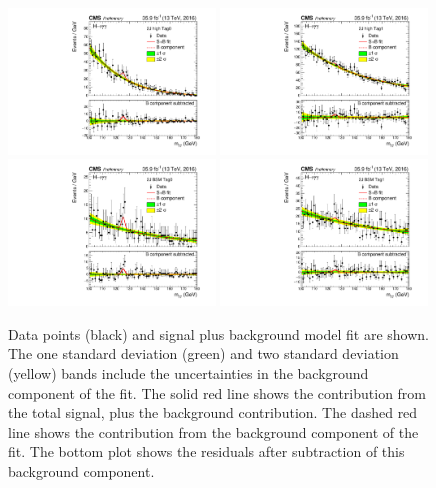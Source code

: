 \begin{figure}[hptb]
  \centering
  \includegraphics[width=0.49\textwidth]{Figures/Appendices/_forAppendix2016ch1_RECO_GE2J_PTH_120_200_Tag0_13TeV.pdf}
  \includegraphics[width=0.49\textwidth]{Figures/Appendices/_forAppendix2016ch1_RECO_GE2J_PTH_120_200_Tag1_13TeV.pdf}
  \includegraphics[width=0.49\textwidth]{Figures/Appendices/_forAppendix2016ch1_RECO_GE2J_PTH_GT200_Tag0_13TeV.pdf}
  \includegraphics[width=0.49\textwidth]{Figures/Appendices/_forAppendix2016ch1_RECO_GE2J_PTH_GT200_Tag1_13TeV.pdf}
  \caption[Signal plus background fits to data.]
  {
    Data points (black) and signal plus background model fit are shown. 
    The one standard deviation (green) and two standard deviation (yellow) bands 
    include the uncertainties in the background component of the fit. 
    The solid red line shows the contribution from the total signal, plus the background contribution. 
    The dashed red line shows the contribution from the background component of the fit. 
    The bottom plot shows the residuals after subtraction of this background component.
  }
\end{figure}

